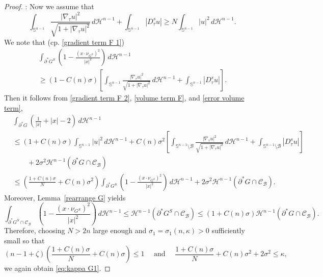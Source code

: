 \documentclass[reqno,11pt]{amsart}
\def\kz{\kappa}
\def\sz{\sigma}
\numberwithin{equation}{section}
\theoremstyle{remark}
\begin{document}
\begin{proof}
\medskip
{}: 
Now we assume that
\begin{equation}\label{case 2}
    \int_{\mathbb S^{n-1} }  \frac{|\nabla_\tau  u|^2}{\sqrt{1+ |\nabla_\tau u|^2}} \,d\mathscr H^{n-1} + \int_{\mathbb S^{n-1}}|D^s_\tau u|\geq N  \int_{\mathbb S^{n-1}} {|u|^2} \,d\mathscr H^{n-1}.
\end{equation}
We note that (cp. \eqref{gradient term F 1})
\begin{multline}
  \int_{\partial^* G^S }  \left(1-\frac{(x\cdot \nu_{G^S} )^2}{|x|^2}\right) \, d\mathscr H^{n-1}\\ 
\ge (1-C(n)\sz) \left[\int_{\mathbb S^{n-1}} \frac{|\nabla_\tau u|^2}{\sqrt{1+|\nabla_\tau u|^2}}   \, d\mathscr H^{n-1} + \int_{\mathbb S^{n-1}}|D^s_\tau u|\right]. \label{gradient term F 2}
\end{multline}
Then it follows from \eqref{gradient term F 2}, \eqref{volume term F}, and \eqref{error volume term}, 
\begin{align*}
   & \int_{\partial^* G}\left(\frac{1}{|x|}+|x|-2\right)  \,  d\mathscr H^{n-1}\\
   &\leq (1+C(n) \sz)\int_{\mathbb S^{n-1}} |u|^2  \,  d\mathscr H^{n-1} +C(n)\sz^2 \left[\int_{\mathbb S^{n-1}\setminus \mathcal B} \frac{|\nabla_\tau u|^2}{\sqrt{1+|\nabla_\tau u|^2}}    \,  d\mathscr H^{n-1} + \int_{\mathbb S^{n-1}\setminus \mathcal B}|D^s_\tau u|\right]\\
   &\qquad + 2\sz^2 \mathscr H^{n-1}(\partial^* G\cap \mathcal{C}_{\mathcal B}) \\
    & \leq  \left(\frac{1+C(n)\sz}{N} + C(n)\sz^2\right)   \int_{\partial^* G^S }  \left(1-\frac{(x\cdot \nu_{G^S} )^2}{|x|^2}\right) \, d\mathscr H^{n-1} + 2\sz^2 \mathscr H^{n-1}(\partial^* G\cap \mathcal{C}_{\mathcal B}).  
\end{align*}
Moreover, Lemma~\ref{rearrange G} yields
$$\int_{\partial^* G^S\cap \mathcal{C}_{\mathcal B} }  \left(1-\frac{(x\cdot \nu_{G^S} )^2}{|x|^2}\right) \, d\mathscr H^{n-1}\le \mathscr H^{n-1}(\partial^* G^S\cap \mathcal{C}_{\mathcal B})\le (1+C(n)\sz) \mathscr H^{n-1}(\partial^* G\cap \mathcal{C}_{\mathcal B}). $$
Therefore, choosing $N>2n$ large enough and $\sz_1=\sz_1(n,\kz)>0 $ sufficiently small so that
$$
(n-1+\zeta) \left(\frac{1+C(n)\sz}{N} + C(n)\sz\right)\le 1 \quad \text{ and } \quad \frac{1+C(n)\sz}{N} +C(n)\sigma^2 +2\sigma^2 \le \kz,
$$
we again obtain \eqref{eq:kappa G1}.

\bigskip



\end{proof}
\end{document}
